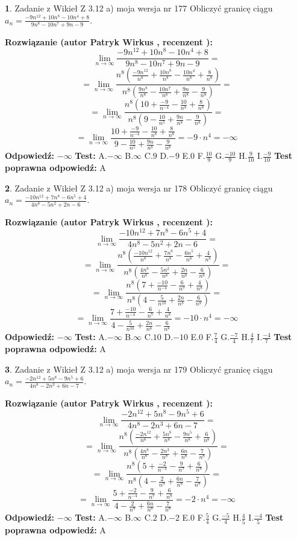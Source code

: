 \documentclass[12pt, a4paper]{article}
\theoremstyle{definition} %
\newtheorem{zad}{}
\newcommand{\zadStart}[1]{\begin{zad}#1\newline}
\newcommand{\zadStop}{\end{zad}}
\newcommand{\rozwStart}[2]{\noindent \textbf{Rozwiązanie (autor #1 , recenzent #2): }\newline}
\newcommand{\rozwStop}{\newline}
\newcommand{\odpStart}{\noindent \textbf{Odpowiedź:}\newline}
\newcommand{\odpStop}{\newline}
\newcommand{\testStart}{\noindent \textbf{Test:}\newline}
\newcommand{\testStop}{\newline}
\newcommand{\kluczStart}{\noindent \textbf{Test poprawna odpowiedź:}\newline}
\newcommand{\kluczStop}{\newline}
\begin{document}
\zadStart{Zadanie z Wikieł Z 3.12 a) moja wersja nr 177}
Obliczyć granicę ciągu $a_{n}=\frac{-9n^{12}+10n^{8}-10n^{4}+8}{9n^{8}-10n^{7}+9n-9}$.
\zadStop
\rozwStart{Patryk Wirkus}{}
$$\lim\limits_{n\to\infty}\frac{-9n^{12}+10n^{8}-10n^{4}+8}{9n^{8}-10n^{7}+9n-9}=$$
$$=\lim\limits_{n\to\infty}\frac{n^{8}\left(\frac{-9n^{12}}{n^{8}}+\frac{10n^{8}}{n^{8}}-\frac{10n^{4}}{n^{8}}+\frac{8}{n^{8}}\right)}{n^{8}\left(\frac{9n^{8}}{n^{8}}-\frac{10n^{7}}{n^{8}}+\frac{9n}{n^{8}}-\frac{9}{n^{8}}\right)}=$$
$$=\lim\limits_{n\to\infty}\frac{n^{8}\left(10+\frac{-9}{n^{-4}}-\frac{10}{n^{8}}+\frac{8}{n^{8}}\right)}
{n^{8}\left(9-\frac{10}{n^{5}}+\frac{9n}{n^{8}}-\frac{9}{n^{8}}\right)}=$$
$$=\lim\limits_{n\to\infty}\frac{10+\frac{-9}{n^{-4}}-\frac{10}{n^{8}}+\frac{8}{n^{8}}}{9-\frac{10}{n^{5}}+\frac{9n}{n^{8}}-\frac{9}{n^{8}}}=-9\cdot n^{4} = -\infty$$
\rozwStop
\odpStart
$-\infty$
\odpStop
\testStart
A.$-\infty$
B.$\infty$
C.$9$
D.$-9$
E.$0$
F.$\frac{10}{9}$
G.$\frac{-10}{9}$
H.$\frac{9}{10}$
I.$\frac{-9}{10}$
\testStop
\kluczStart
A
\kluczStop



\zadStart{Zadanie z Wikieł Z 3.12 a) moja wersja nr 178}
Obliczyć granicę ciągu $a_{n}=\frac{-10n^{12}+7n^{8}-6n^{5}+4}{4n^{8}-5n^{2}+2n-6}$.
\zadStop
\rozwStart{Patryk Wirkus}{}
$$\lim\limits_{n\to\infty}\frac{-10n^{12}+7n^{8}-6n^{5}+4}{4n^{8}-5n^{2}+2n-6}=$$
$$=\lim\limits_{n\to\infty}\frac{n^{8}\left(\frac{-10n^{12}}{n^{8}}+\frac{7n^{8}}{n^{8}}-\frac{6n^{5}}{n^{8}}+\frac{4}{n^{8}}\right)}{n^{8}\left(\frac{4n^{8}}{n^{8}}-\frac{5n^{2}}{n^{8}}+\frac{2n}{n^{8}}-\frac{6}{n^{8}}\right)}=$$
$$=\lim\limits_{n\to\infty}\frac{n^{8}\left(7+\frac{-10}{n^{-4}}-\frac{6}{n^{7}}+\frac{4}{n^{8}}\right)}
{n^{8}\left(4-\frac{5}{n^{10}}+\frac{2n}{n^{8}}-\frac{6}{n^{8}}\right)}=$$
$$=\lim\limits_{n\to\infty}\frac{7+\frac{-10}{n^{-4}}-\frac{6}{n^{7}}+\frac{4}{n^{8}}}{4-\frac{5}{n^{10}}+\frac{2n}{n^{8}}-\frac{6}{n^{8}}}=-10\cdot n^{4} = -\infty$$
\rozwStop
\odpStart
$-\infty$
\odpStop
\testStart
A.$-\infty$
B.$\infty$
C.$10$
D.$-10$
E.$0$
F.$\frac{7}{4}$
G.$\frac{-7}{4}$
H.$\frac{4}{7}$
I.$\frac{-4}{7}$
\testStop
\kluczStart
A
\kluczStop



\zadStart{Zadanie z Wikieł Z 3.12 a) moja wersja nr 179}
Obliczyć granicę ciągu $a_{n}=\frac{-2n^{12}+5n^{8}-9n^{5}+6}{4n^{8}-2n^{3}+6n-7}$.
\zadStop
\rozwStart{Patryk Wirkus}{}
$$\lim\limits_{n\to\infty}\frac{-2n^{12}+5n^{8}-9n^{5}+6}{4n^{8}-2n^{3}+6n-7}=$$
$$=\lim\limits_{n\to\infty}\frac{n^{8}\left(\frac{-2n^{12}}{n^{8}}+\frac{5n^{8}}{n^{8}}-\frac{9n^{5}}{n^{8}}+\frac{6}{n^{8}}\right)}{n^{8}\left(\frac{4n^{8}}{n^{8}}-\frac{2n^{3}}{n^{8}}+\frac{6n}{n^{8}}-\frac{7}{n^{8}}\right)}=$$
$$=\lim\limits_{n\to\infty}\frac{n^{8}\left(5+\frac{-2}{n^{-4}}-\frac{9}{n^{7}}+\frac{6}{n^{8}}\right)}
{n^{8}\left(4-\frac{2}{n^{9}}+\frac{6n}{n^{8}}-\frac{7}{n^{8}}\right)}=$$
$$=\lim\limits_{n\to\infty}\frac{5+\frac{-2}{n^{-4}}-\frac{9}{n^{7}}+\frac{6}{n^{8}}}{4-\frac{2}{n^{9}}+\frac{6n}{n^{8}}-\frac{7}{n^{8}}}=-2\cdot n^{4} = -\infty$$
\rozwStop
\odpStart
$-\infty$
\odpStop
\testStart
A.$-\infty$
B.$\infty$
C.$2$
D.$-2$
E.$0$
F.$\frac{5}{4}$
G.$\frac{-5}{4}$
H.$\frac{4}{5}$
I.$\frac{-4}{5}$
\testStop
\kluczStart
A
\kluczStop
\end{document}
